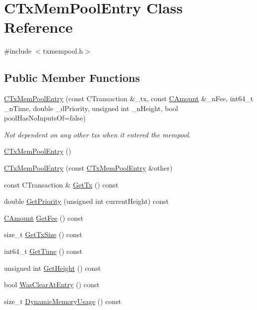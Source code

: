 \hypertarget{class_c_tx_mem_pool_entry}{}\section{C\+Tx\+Mem\+Pool\+Entry Class Reference}
\label{class_c_tx_mem_pool_entry}


{\ttfamily \#include $<$txmempool.\+h$>$}

\subsection*{Public Member Functions}
\begin{DoxyCompactItemize}
\item 
\mbox{\hyperlink{class_c_tx_mem_pool_entry_a7867674ecd833e9344d772bf19657768}{C\+Tx\+Mem\+Pool\+Entry}} (const C\+Transaction \&\+\_\+tx, const \mbox{\hyperlink{amount_8h_a4eaf3a5239714d8c45b851527f7cb564}{C\+Amount}} \&\+\_\+n\+Fee, int64\+\_\+t \+\_\+n\+Time, double \+\_\+d\+Priority, unsigned int \+\_\+n\+Height, bool pool\+Has\+No\+Inputs\+Of=false)
\begin{DoxyCompactList}\small\item\em Not dependent on any other txs when it entered the mempool. \end{DoxyCompactList}\item 
\mbox{\hyperlink{class_c_tx_mem_pool_entry_a4a22f1c696136f99f5c296c90cf0406a}{C\+Tx\+Mem\+Pool\+Entry}} ()
\item 
\mbox{\hyperlink{class_c_tx_mem_pool_entry_ad62eaba6adc7ec36487ae690b5b93148}{C\+Tx\+Mem\+Pool\+Entry}} (const \mbox{\hyperlink{class_c_tx_mem_pool_entry}{C\+Tx\+Mem\+Pool\+Entry}} \&other)
\item 
const C\+Transaction \& \mbox{\hyperlink{class_c_tx_mem_pool_entry_a2deed4202061edf8b040a3f554417c20}{Get\+Tx}} () const
\item 
double \mbox{\hyperlink{class_c_tx_mem_pool_entry_a189d5dbafa6e955524692c0743dc0e0b}{Get\+Priority}} (unsigned int current\+Height) const
\item 
\mbox{\hyperlink{amount_8h_a4eaf3a5239714d8c45b851527f7cb564}{C\+Amount}} \mbox{\hyperlink{class_c_tx_mem_pool_entry_addd42d65919922f8d864c702aa9a7cfb}{Get\+Fee}} () const
\item 
size\+\_\+t \mbox{\hyperlink{class_c_tx_mem_pool_entry_a89325fcaa8efbd1d6fe68c39d7d676b0}{Get\+Tx\+Size}} () const
\item 
int64\+\_\+t \mbox{\hyperlink{class_c_tx_mem_pool_entry_a9da5719dfd04508342009bea9c752160}{Get\+Time}} () const
\item 
unsigned int \mbox{\hyperlink{class_c_tx_mem_pool_entry_a319f8093929fc5b6c3c66ba53ac172b5}{Get\+Height}} () const
\item 
bool \mbox{\hyperlink{class_c_tx_mem_pool_entry_a1be87eeaf1d502868d2b7a44ed8ba1d1}{Was\+Clear\+At\+Entry}} () const
\item 
size\+\_\+t \mbox{\hyperlink{class_c_tx_mem_pool_entry_ab5b85d9bd797a134072fe8706d6d7e7e}{Dynamic\+Memory\+Usage}} () const
\end{DoxyCompactItemize}
